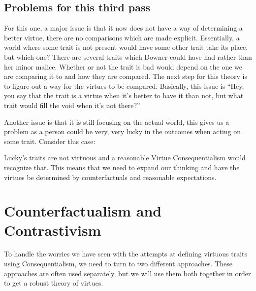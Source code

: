 \subsection{Problems for this third pass}

For this one, a major issue is that it now does not have a way of determining a better virtue, there are no comparisons which are made explicit. Essentially, a world where some trait is not present would have some other trait take its place, but which one? There are several traits which Downer could have had rather than her minor malice. Whether or not the trait is bad would depend on the one we are comparing it to and how they are compared.  The next step for this theory is to figure out a way for the virtues to be compared. Basically, this issue is “Hey, you say that the trait is a virtue when it’s better to have it than not, but what trait would fill the void when it’s not there?”

Another issue is that it is still focusing on the actual world, this gives us a problem as a person could be very, very lucky in the outcomes when acting on some trait. Consider this case:


Lucky’s traits are not virtuous and a reasonable Virtue Consequentialism would recognize that. This means that we need to expand our thinking and have the virtues be determined by counterfactuals and reasonable expectations.

\section{Counterfactualism and Contrastivism}

To handle the worries we have seen with the attempts at defining virtuous traits using Consequentialism, we need to turn to two different approaches. These approaches are often used separately, but we will use them both together in order to get a robust theory of virtues. 

